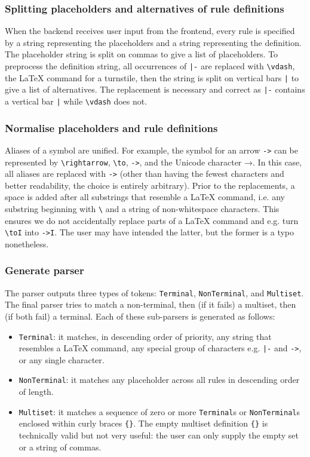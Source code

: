 \subsubsection{Splitting placeholders and alternatives of rule definitions}
When the backend receives user input from the frontend, every rule is specified by a string representing the placeholders and a string representing the definition. The placeholder string is split on commas to give a list of placeholders. To preprocess the definition string, all occurrences of \lstinline{|-} are replaced with \lstinline{\vdash}, the \LaTeX{} command for a turnstile, then the string is split on vertical bars \lstinline{|} to give a list of alternatives. The replacement is necessary and correct as \lstinline{|-} contains a vertical bar \lstinline{|} while \lstinline{\vdash} does not.

\subsubsection{Normalise placeholders and rule definitions}
Aliases of a symbol are unified. For example, the symbol for an arrow \lstinline{->} can be represented by \lstinline{\rightarrow}, \lstinline{\to}, \lstinline{->}, and the Unicode character →. In this case, all aliases are replaced with \lstinline{->} (other than having the fewest characters and better readability, the choice is entirely arbitrary). Prior to the replacements, a space is added after all substrings that resemble a \LaTeX{} command, i.e. any substring beginning with \lstinline{\} and a string of non-whitespace characters. This ensures we do not accidentally replace parts of a \LaTeX{} command and e.g. turn \lstinline{\toI} into \lstinline{->I}. The user may have intended the latter, but the former is a typo nonetheless.

\subsubsection{Generate parser}
The parser outputs three types of tokens: \lstinline{Terminal}, \lstinline{NonTerminal}, and \lstinline{Multiset}. The final parser tries to match a non-terminal, then (if it fails) a multiset, then (if both fail) a terminal. Each of these sub-parsers is generated as follows:
\begin{itemize}
    \item \lstinline{Terminal}: it matches, in descending order of priority, any string that resembles a \LaTeX{} command, any special group of characters e.g. \lstinline{|-} and \lstinline{->}, or any single character.
    \item \lstinline{NonTerminal}: it matches any placeholder across all rules in descending order of length.
    \item \lstinline{Multiset}: it matches a sequence of zero or more \lstinline{Terminal}s or \lstinline{NonTerminal}s enclosed within curly braces \lstinline|{}|. The empty multiset definition \lstinline|{}| is technically valid but not very useful: the user can only supply the empty set or a string of commas.
\end{itemize}


